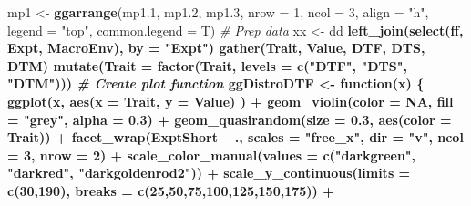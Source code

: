 \documentclass[
]{article}
\newenvironment{Shaded}{\begin{snugshade}}{\end{snugshade}}
\newcommand{\CommentTok}[1]{\textcolor[rgb]{0.56,0.35,0.01}{\textit{#1}}}
\newcommand{\ControlFlowTok}[1]{\textcolor[rgb]{0.13,0.29,0.53}{\textbf{#1}}}
\newcommand{\DataTypeTok}[1]{\textcolor[rgb]{0.13,0.29,0.53}{#1}}
\newcommand{\DecValTok}[1]{\textcolor[rgb]{0.00,0.00,0.81}{#1}}
\newcommand{\FloatTok}[1]{\textcolor[rgb]{0.00,0.00,0.81}{#1}}
\newcommand{\KeywordTok}[1]{\textcolor[rgb]{0.13,0.29,0.53}{\textbf{#1}}}
\newcommand{\NormalTok}[1]{#1}
\newcommand{\OperatorTok}[1]{\textcolor[rgb]{0.81,0.36,0.00}{\textbf{#1}}}
\newcommand{\OtherTok}[1]{\textcolor[rgb]{0.56,0.35,0.01}{#1}}
\newcommand{\StringTok}[1]{\textcolor[rgb]{0.31,0.60,0.02}{#1}}
\begin{document}
\begin{Shaded}
\begin{Highlighting}[]
{{{{{\NormalTok{mp1 <-}\StringTok{ }\KeywordTok{ggarrange}\NormalTok{(mp1}\FloatTok{.1}\NormalTok{, mp1}\FloatTok{.2}\NormalTok{, mp1}\FloatTok{.3}\NormalTok{, }\DataTypeTok{nrow =} \DecValTok{1}\NormalTok{, }\DataTypeTok{ncol =} \DecValTok{3}\NormalTok{, }\DataTypeTok{align =} \StringTok{"h"}\NormalTok{,}
                 \DataTypeTok{legend =} \StringTok{"top"}\NormalTok{, }\DataTypeTok{common.legend =}\NormalTok{ T)}
\CommentTok{# Prep data}
\NormalTok{xx <-}\StringTok{ }\NormalTok{dd }\OperatorTok{%
\StringTok{  }\KeywordTok{left_join}\NormalTok{(}\KeywordTok{select}\NormalTok{(ff, Expt, MacroEnv), }\DataTypeTok{by =} \StringTok{"Expt"}\NormalTok{) }\OperatorTok{%
\StringTok{  }\KeywordTok{gather}\NormalTok{(Trait, Value, DTF, DTS, DTM) }\OperatorTok{%
\StringTok{  }\KeywordTok{mutate}\NormalTok{(}\DataTypeTok{Trait =} \KeywordTok{factor}\NormalTok{(Trait, }\DataTypeTok{levels =} \KeywordTok{c}\NormalTok{(}\StringTok{"DTF"}\NormalTok{, }\StringTok{"DTS"}\NormalTok{, }\StringTok{"DTM"}\NormalTok{)))}
\CommentTok{# Create plot function}
\NormalTok{ggDistroDTF <-}\StringTok{ }\ControlFlowTok{function}\NormalTok{(x) \{}
  \KeywordTok{ggplot}\NormalTok{(x, }\KeywordTok{aes}\NormalTok{(}\DataTypeTok{x =}\NormalTok{ Trait, }\DataTypeTok{y =}\NormalTok{ Value) ) }\OperatorTok{+}
\StringTok{    }\KeywordTok{geom_violin}\NormalTok{(}\DataTypeTok{color =} \OtherTok{NA}\NormalTok{, }\DataTypeTok{fill =} \StringTok{"grey"}\NormalTok{, }\DataTypeTok{alpha =} \FloatTok{0.3}\NormalTok{) }\OperatorTok{+}\StringTok{ }
\StringTok{    }\KeywordTok{geom_quasirandom}\NormalTok{(}\DataTypeTok{size =} \FloatTok{0.3}\NormalTok{, }\KeywordTok{aes}\NormalTok{(}\DataTypeTok{color =}\NormalTok{ Trait)) }\OperatorTok{+}
\StringTok{    }\KeywordTok{facet_wrap}\NormalTok{(ExptShort }\OperatorTok{~}\StringTok{ }\NormalTok{., }\DataTypeTok{scales =} \StringTok{"free_x"}\NormalTok{, }\DataTypeTok{dir =} \StringTok{"v"}\NormalTok{, }\DataTypeTok{ncol =} \DecValTok{3}\NormalTok{, }\DataTypeTok{nrow =} \DecValTok{2}\NormalTok{) }\OperatorTok{+}\StringTok{ }
\StringTok{    }\KeywordTok{scale_color_manual}\NormalTok{(}\DataTypeTok{values =} \KeywordTok{c}\NormalTok{(}\StringTok{"darkgreen"}\NormalTok{, }\StringTok{"darkred"}\NormalTok{, }\StringTok{"darkgoldenrod2"}\NormalTok{)) }\OperatorTok{+}
\StringTok{    }\KeywordTok{scale_y_continuous}\NormalTok{(}\DataTypeTok{limits =} \KeywordTok{c}\NormalTok{(}\DecValTok{30}\NormalTok{,}\DecValTok{190}\NormalTok{), }\DataTypeTok{breaks =} \KeywordTok{c}\NormalTok{(}\DecValTok{25}\NormalTok{,}\DecValTok{50}\NormalTok{,}\DecValTok{75}\NormalTok{,}\DecValTok{100}\NormalTok{,}\DecValTok{125}\NormalTok{,}\DecValTok{150}\NormalTok{,}\DecValTok{175}\NormalTok{)) }\OperatorTok{+}
}}}}}}}}
\end{Highlighting}
\end{Shaded}
\end{document}
